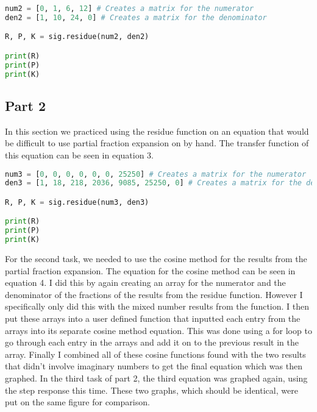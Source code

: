 \documentclass[12pt]{report}
\begin{document}
\begin{lstlisting}[language=Python]
num2 = [0, 1, 6, 12] # Creates a matrix for the numerator
den2 = [1, 10, 24, 0] # Creates a matrix for the denominator

R, P, K = sig.residue(num2, den2)

print(R)
print(P)
print(K)
\end{lstlisting}
\subsection{Part 2}
In this section we practiced using the residue function on an equation
that would be difficult to use partial fraction expansion on by hand. The
transfer function of this equation can be seen in equation 3.
\begin{lstlisting}[language=Python]
num3 = [0, 0, 0, 0, 0, 0, 25250] # Creates a matrix for the numerator
den3 = [1, 18, 218, 2036, 9085, 25250, 0] # Creates a matrix for the denominator

R, P, K = sig.residue(num3, den3)

print(R)
print(P)
print(K)
\end{lstlisting}
For the second task, we needed to use the cosine method for the results
from the partial fraction expansion. The equation for the cosine method
can be seen in equation 4. I did this by again creating an
array for the numerator and the denominator of the fractions of the results
from the residue function. However I specifically only did this with the
mixed number results from the function. I then put these arrays into a 
user defined function that inputted each entry from the arrays into its
separate cosine method equation. This was done using a for loop to go
through each entry in the arrays and add it on to the previous result in the
array. Finally I combined all of these cosine functions found with the two
results that didn't involve imaginary numbers to get the final equation which was then graphed. In the third task of part 2, the third equation was
graphed again, using the step response this time. These two graphs, which
should be identical, were put on the same figure for comparison.
\end{document}
